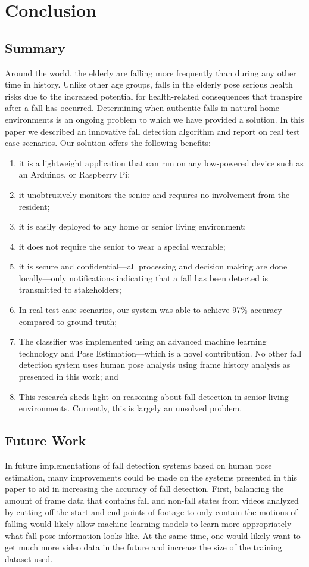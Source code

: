\chapter{Conclusion}

\section{Summary}
Around the world, the elderly are falling more frequently than during any other time in history. Unlike other age groups, falls in the elderly pose serious health risks due to the increased potential for health-related consequences that transpire after a fall has occurred.
Determining when authentic falls in natural home environments is an ongoing problem to which we have provided a solution. In this paper we described an innovative fall detection algorithm and report on real test case scenarios. Our solution offers the following benefits:

\begin{enumerate}
\item it is a lightweight application that can run on any low-powered device such as an Arduinos, or Raspberry Pi;
\item it unobtrusively monitors the senior and requires no involvement from the resident;
\item it is easily deployed to any home or senior living environment;
\item it does not require the senior to wear a special wearable;
\item it is secure and confidential—all processing and decision making are done locally—only notifications indicating that a fall has been detected is transmitted to stakeholders;
\item In real test case scenarios, our system was able to achieve 97\% accuracy compared to ground truth;
\item The classifier was implemented using an advanced machine learning technology and Pose Estimation—which is a novel contribution. No other fall detection system uses human pose analysis using frame history analysis as presented in this work; and
\item This research sheds light on reasoning about fall detection in senior living environments.  Currently, this is largely an unsolved problem.
\end{enumerate}

\section{Future Work}
In future implementations of fall detection systems based on human pose estimation, many improvements could be made on the systems presented in this paper to aid in increasing the accuracy of fall detection. First, balancing the amount of frame data that contains fall and non-fall states from videos analyzed by cutting off the start and end points of footage to only contain the motions of falling would likely allow machine learning models to learn more appropriately what fall pose information looks like. At the same time, one would likely want to get much more video data in the future and increase the size of the training dataset used.


